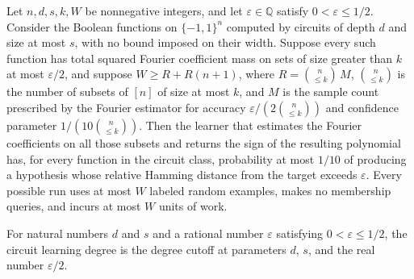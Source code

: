 \begin{theorem}
\label{FABL.theorem4_31_of_lowDegreeConcentration}
\leanok
{}
Let $n,d,s,k,W$ be nonnegative integers, and let $\varepsilon\in\mathbb Q$ satisfy
$0<\varepsilon\le1/2$. Consider the Boolean functions on $\{-1,1\}^n$ computed by
circuits of depth $d$ and size at most $s$, with no bound imposed on their width.
Suppose every such function has total squared Fourier coefficient mass on sets of size
greater than $k$ at most $\varepsilon/2$, and suppose $W\ge R+R(n+1)$, where
$R=\binom{n}{\le k}\,M$, $\binom{n}{\le k}$ is the number of subsets of $[n]$ of size at
most $k$, and $M$ is the sample count prescribed by the Fourier estimator for accuracy
$\varepsilon/(2\binom{n}{\le k})$ and confidence parameter $1/(10\binom{n}{\le k})$.
Then the learner that estimates the Fourier coefficients on all those subsets and
returns the sign of the resulting polynomial has, for every function in the circuit
class, probability at most $1/10$ of producing a hypothesis whose relative Hamming
distance from the target exceeds $\varepsilon$. Every possible run uses at most $W$
labeled random examples, makes no membership queries, and incurs at most $W$ units of
work.
\end{theorem}

\begin{definition}
\label{FABL.lmnCircuitLearningDegree}
\leanok
{}
For natural numbers $d$ and $s$ and a rational number $\varepsilon$ satisfying
$0<\varepsilon\leq 1/2$, the circuit learning degree is the degree cutoff at parameters
$d$, $s$, and the real number $\varepsilon/2$.
\end{definition}


